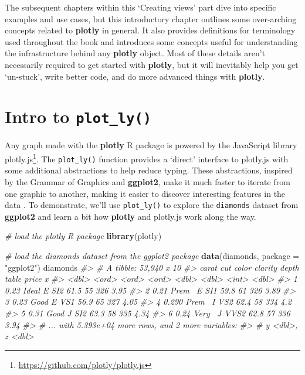 \documentclass[
  12pt,
]{krantz}
\newenvironment{Shaded}{\begin{snugshade}}{\end{snugshade}}
\newcommand{\CommentTok}[1]{\textcolor[rgb]{0.56,0.35,0.01}{\textit{#1}}}
\newcommand{\DataTypeTok}[1]{\textcolor[rgb]{0.13,0.29,0.53}{#1}}
\newcommand{\KeywordTok}[1]{\textcolor[rgb]{0.13,0.29,0.53}{\textbf{#1}}}
\newcommand{\NormalTok}[1]{#1}
\newcommand{\StringTok}[1]{\textcolor[rgb]{0.31,0.60,0.02}{#1}}
\renewcommand{\href}[2]{#2\footnote{\url{#1}}}
\begin{document}
The subsequent chapters within this `Creating views' part dive into specific examples and use cases, but this introductory chapter outlines some over-arching concepts related to \textbf{plotly} in general. It also provides definitions for terminology used throughout the book and introduces some concepts useful for understanding the infrastructure behind any \textbf{plotly} object. Most of these details aren't necessarily required to get started with \textbf{plotly}, but it will inevitably help you get `un-stuck', write better code, and do more advanced things with \textbf{plotly}.

\hypertarget{intro-plotly}{%
\section{\texorpdfstring{Intro to \texttt{plot\_ly()}}{Intro to plot\_ly()}}\label{intro-plotly}}


Any graph made with the \textbf{plotly} R package is powered by the JavaScript library \href{https://github.com/plotly/plotly.js}{plotly.js}. The \texttt{plot\_ly()} function provides a `direct' interface to plotly.js with some additional abstractions to help reduce typing. These abstractions, inspired by the Grammar of Graphics and \textbf{ggplot2}, make it much faster to iterate from one graphic to another, making it easier to discover interesting features in the data \citep{Wilkinson:2005, ggplot2}. To demonstrate, we'll use \texttt{plot\_ly()} to explore the \texttt{diamonds} dataset from \textbf{ggplot2} and learn a bit how \textbf{plotly} and plotly.js work along the way.

\begin{Shaded}
\begin{Highlighting}[]
\CommentTok{# load the plotly R package}
\KeywordTok{library}\NormalTok{(plotly)}

\CommentTok{# load the diamonds dataset from the ggplot2 package}
\KeywordTok{data}\NormalTok{(diamonds, }\DataTypeTok{package =} \StringTok{"ggplot2"}\NormalTok{)}
\NormalTok{diamonds}
\CommentTok{#> # A tibble: 53,940 x 10}
\CommentTok{#>   carat cut   color clarity depth table price     x}
\CommentTok{#>   <dbl> <ord> <ord> <ord>   <dbl> <dbl> <int> <dbl>}
\CommentTok{#> 1 0.23  Ideal E     SI2      61.5    55   326  3.95}
\CommentTok{#> 2 0.21  Prem~ E     SI1      59.8    61   326  3.89}
\CommentTok{#> 3 0.23  Good  E     VS1      56.9    65   327  4.05}
\CommentTok{#> 4 0.290 Prem~ I     VS2      62.4    58   334  4.2 }
\CommentTok{#> 5 0.31  Good  J     SI2      63.3    58   335  4.34}
\CommentTok{#> 6 0.24  Very~ J     VVS2     62.8    57   336  3.94}
\CommentTok{#> # ... with 5.393e+04 more rows, and 2 more variables:}
\CommentTok{#> #   y <dbl>, z <dbl>}
\end{Highlighting}
\end{Shaded}
\end{document}
